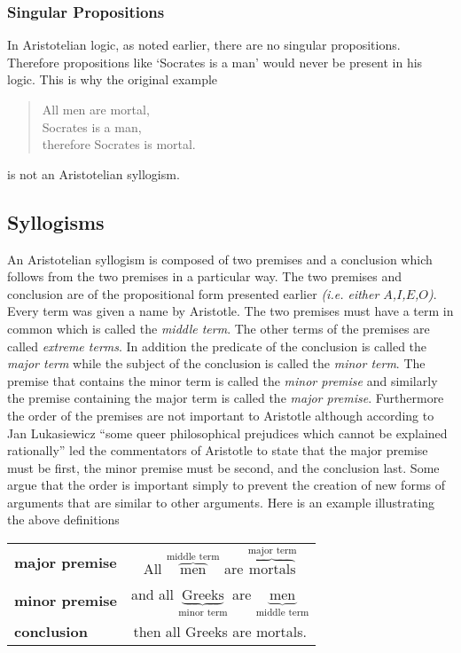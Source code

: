 \documentclass[12pt]{article}
\begin{document}
\subsubsection*{Singular Propositions}
In Aristotelian logic, as noted earlier, there are no singular propositions.  Therefore propositions like `Socrates is a man' would never be present in his logic.  This is why the original example 
\begin{quote}
\begin{center}
All men are mortal,\\
Socrates is a man,\\
therefore Socrates is mortal.
\end{center}
\end{quote}
is not an Aristotelian syllogism.

\subsection*{Syllogisms}
An Aristotelian syllogism is composed of two premises and a conclusion which follows from the two premises in a particular way.  The two premises and conclusion are of the propositional form presented earlier \textit{(i.e. either $A$,$I$,$E$,$O$)}.  Every term was given a name by Aristotle.  The two premises must have a term in common which is called the \emph{middle term}.  The other terms of the premises are called \emph{extreme terms}.   In addition the predicate of the conclusion is called the \emph{major term} while the subject of the conclusion is called the \emph{minor term}.  The premise that contains the minor term is called the \emph{minor premise} and similarly the premise containing the major term is called the \emph{major premise}.\cite{SR}  Furthermore the order of the premises are not important to Aristotle although according to Jan Lukasiewicz ``some queer philosophical prejudices which cannot be explained rationally'' led the commentators of Aristotle to state that the major premise must be first, the minor premise must be second, and the conclusion last.\cite{LJ}  Some argue that the order is important simply to prevent the creation of new forms of arguments that are similar to other arguments.\cite{PH}
Here is an example illustrating the above definitions
\begin{center}
\begin{tabular}{l c}
\textbf{major premise} & All $\overbrace{\text{men}}^{\text{middle term}}$ are $\overbrace{\text{mortals}}^{\text{major term}}$\\
\textbf{minor premise} & and all $\underbrace{\text{Greeks}}_{\text{minor term}}$ are $\underbrace{\text{men}}_{\text{middle term}}$\\
\textbf{conclusion} & then all Greeks are mortals.\\
\end{tabular}
\end{center}
\end{document}
